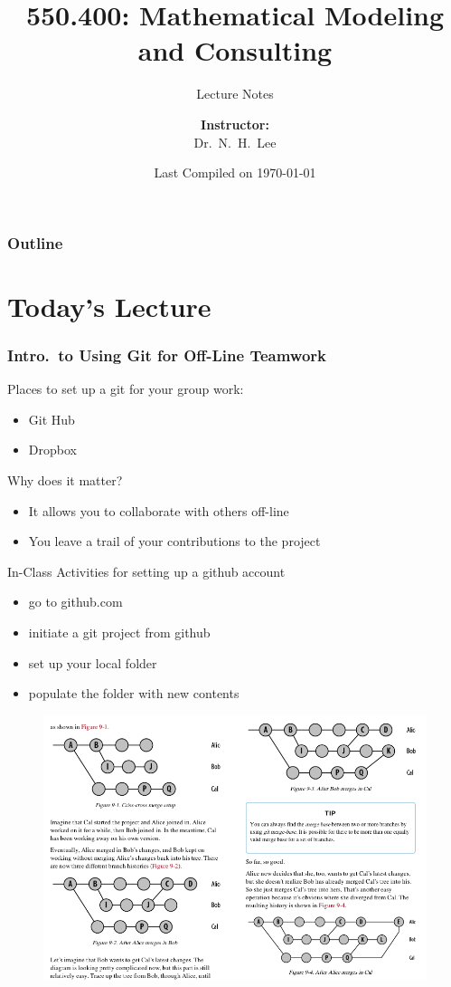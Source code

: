 \documentclass[hyperref={colorlinks=false},handout,10pt]{beamer}
\title{{\color{blue} \LARGE 550.400: Mathematical Modeling and Consulting\newline} }
\subtitle{{\color{red} \large Lecture Notes} }
\author{ 
    {\bf{Instructor:}} \\ 
Dr.~N.~H.~Lee \\ 
    \vspace{5pt}
}
\institute{JHU AMS 2012 FALL}
\date{\mygreen Last Compiled on \today}
\let\olditem\item
\renewcommand{\item}{\setlength{\itemsep}{0.5\baselineskip}\olditem}
\begin{document}
\begin{frame}[plain]
  \titlepage
\end{frame}

\begin{frame}
  \frametitle{Outline}
  \tableofcontents
\end{frame}

\section{Today's Lecture}

\begin{frame}
    \frametitle{Intro.\ to Using Git for Off-Line Teamwork}
    Places to set up a git for your group work: 
    \begin{itemize}
        \item Git Hub
        \item Dropbox
    \end{itemize}
    Why does it matter?
    \begin{itemize}
        \item It allows you to collaborate with others off-line
        \item You leave a trail of your contributions to the project
    \end{itemize}
    \begin{block}
        {In-Class Activities for setting up a github account}
        \begin{itemize}
            \item go to github.com
            \item initiate a git project from github
            \item set up your local folder 
            \item populate the folder with new contents
        \end{itemize}
    \end{block}
    \begin{figure}
        \begin{center}
            \includegraphics[width=\textwidth]{images/gitmergeexample.png}

\end{center}
\end{figure}
\end{frame}
\end{document}
